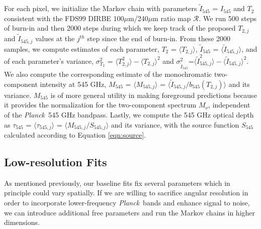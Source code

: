 \documentclass{emulateapj}
\newcommand{\PLANCK}{{\it Planck}}
\begin{document}
For each pixel, we initialize the Markov chain with parameters 
$\tilde{I}_{545}$ = $I_{545}$ and $T_2$ consistent with the FDS99 
DIRBE 100$\mu$m/240$\mu$m ratio map $\mathscr{R}$. We run 500 steps of burn-in 
and then 2000 steps during which we keep track of the proposed $T_{2, j}$ and 
$\tilde{I}_{545, j}$ values at the $j^{th}$ step since the end of burn-in. From
 these 2000 samples, we compute estimates of each parameter, 
$T_2$ = $\langle T_{2, j} \rangle$, $\tilde{I}_{545}$ = 
$\langle \tilde{I}_{545, j} \rangle$, and of each parameter's variance, 
$\sigma^2_{T_2}$ = $\langle T^2_{2, j} \rangle-\langle T_{2, j} \rangle ^2$ and
 $\sigma^2_{\tilde{I}_{545}}$=$\langle \tilde{I}^2_{545, j} 
\rangle-\langle \tilde{I}_{545, j} \rangle ^2$. We also compute the
 corresponding estimate of the monochromatic two-component intensity at 545 
GHz, $M_{545}$ = $\langle M_{545, j} \rangle$ = 
$\langle \tilde{I}_{545, j}/b_{545}(T_{2,j}) \rangle$  and its variance. 
$M_{545}$ is of more general utility in making foreground predictions because 
it provides the normalization for the two-component spectrum $M_{\nu}$, 
independent of the \PLANCK~545 GHz bandpass. Lastly, we compute the 545 GHz
optical depth as $\tau_{545}$ = $\langle \tau_{545, j} \rangle$ = 
$\langle M_{545, j}/S_{545, j} \rangle$ and its variance, with the source 
function $S_{545}$ calculated according to Equation \ref{eqn:source}.



\subsection{Low-resolution Fits}

As mentioned previously, our baseline fits fix several parameters which
in principle could vary spatially. If we are willing to sacrifice angular
resolution in order to incorporate lower-frequency \PLANCK~bands and
enhance signal to noise, we can introduce additional free parameters
and run the Markov chains in higher dimensions.
\end{document}
